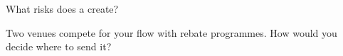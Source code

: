 \begin{interviewq}\label{iq:fm:commercial-relationships-with-venues-brokers-and-vendors:5}
What risks does a  create?
\end{interviewq}

\begin{interviewq}\label{iq:fm:commercial-relationships-with-venues-brokers-and-vendors:6}
Two venues compete for your flow with rebate programmes. How would you decide where to send it?
\end{interviewq}
